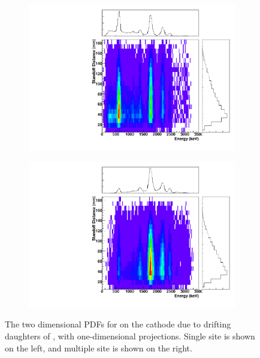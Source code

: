 \documentclass[herrin-thesis.tex]{subfiles}
\begin{document}
\begin{figure}[hp]
\centering
	\begin{subfigure}[b]{0.48\textwidth}
	\centering
	\includegraphics[width=\textwidth]{./plots/PDFs/analysis_pdf_CathodeSurf_Bi214_nochain_ss.pdf}
\end{subfigure}\hfill%
\begin{subfigure}[b]{0.48\textwidth}
	\centering
	\includegraphics[width=1\textwidth]{./plots/PDFs/analysis_pdf_CathodeSurf_Bi214_nochain_ms.pdf}
	\end{subfigure}
\caption[PDF for  on the cathode]{The two dimensional PDFs for  on the cathode due to drifting daughters of , with one-dimensional projections. Single site is shown on the left, and multiple site is shown on the right.}
\label{fig:analysis_pdf_CathodeSurf_Bi214_nochain}
\end{figure}
\end{document}
